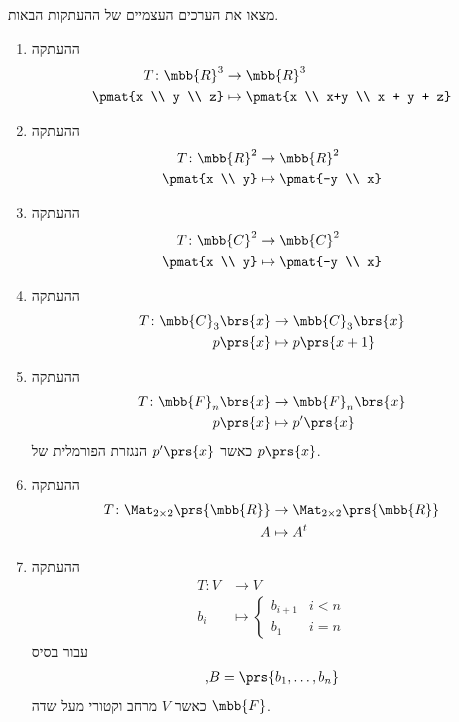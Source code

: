 \documentclass[a4paper,10pt,twoside,openany]{article}
\begin{document}
\begin{exercise}
מצאו את הערכים העצמיים של ההעתקות הבאות.

\begin{enumerate}
\item
ההעתקה
\begin{align*}
T \colon \mbb{R}^3 &\to \mbb{R}^3 \\
\pmat{x \\ y \\ z} &\mapsto \pmat{x \\ x+y \\ x + y + z}
\end{align*}
\item
ההעתקה
\begin{align*}
T \colon \mbb{R}^2 &\to \mbb{R}^2 \\
\pmat{x \\ y} &\mapsto \pmat{-y \\ x}
\end{align*}
\item
ההעתקה
\begin{align*}
T \colon \mbb{C}^2 &\to \mbb{C}^2 \\
\pmat{x \\ y} &\mapsto \pmat{-y \\ x}
\end{align*}
\item ההעתקה
\begin{align*}
T \colon \mbb{C}_3\brs{x} &\to \mbb{C}_3\brs{x} \\
p\prs{x} &\mapsto p\prs{x+1}
\end{align*}
\item ההעתקה
\begin{align*}
T \colon \mbb{F}_n\brs{x} &\to \mbb{F}_n\brs{x} \\
p\prs{x} &\mapsto p'\prs{x}
\end{align*}
כאשר
$p'\prs{x}$
הנגזרת הפורמלית של
$p\prs{x}$.
\item ההעתקה
\begin{align*}
T \colon \Mat_{2\times 2}\prs{\mbb{R}} &\to \Mat_{2 \times 2}\prs{\mbb{R}}\\
A &\mapsto A^t
\end{align*}
\item ההעתקה
\begin{align*}
T \colon V &\to V \\
b_i &\mapsto
\begin{cases}
b_{i+1} & i < n \\
b_1 & i = n
\end{cases}
\end{align*}
עבור בסיס
\begin{align*}
\text{,} B = \prs{b_1, \ldots, b_n}
\end{align*}
כאשר
$V$
מרחב וקטורי מעל שדה
$\mbb{F}$.
\end{enumerate}
\end{exercise}
\end{document}
